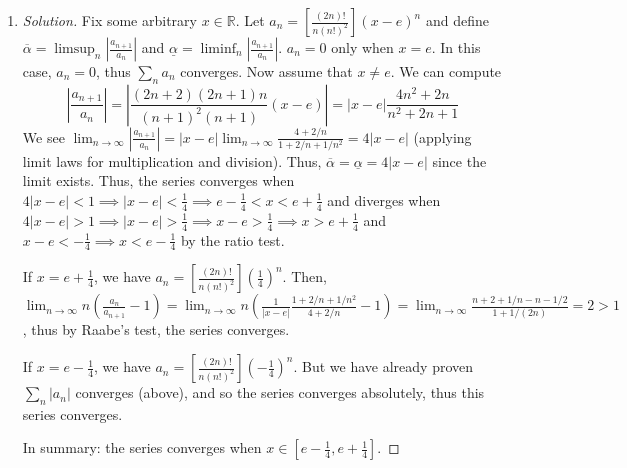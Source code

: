 \documentclass{article}
\newcommand{\R}{{\mathbb R}}
\begin{document}
\begin{enumerate}
\begin{proof}[Solution]
		Finally, if $x = 0$, $a_n = \frac{1}{\sqrt{n}}$,
		thus $\sum_n a_n$ diverges since this is a $p$-series
		where $p = \frac12 < 1$.
		
		In summary: the series converges when $x \in (-\infty,-\frac23] \cup (0,\infty)$.
	\end{proof}
	\item \begin{proof}[Solution]\let\qed\relax
		Fix some arbitrary $x \in \R$.
		Let $a_n = \left[\frac{(2n)!}{n(n!)^2}\right](x-e)^n$
		and define $\overline\alpha = \limsup_n \left|\frac{a_{n+1}}{a_n}\right|$
		and $\underline\alpha = \liminf_n \left|\frac{a_{n+1}}{a_n}\right|$.
		$a_n = 0$ only when $x = e$.
		In this case, $a_n = 0$, thus $\sum_n a_n$ converges.
		Now assume that $x \neq e$.
		We can compute
		\[
			\left\lvert \frac{a_{n+1}}{a_n}\right\rvert
			= \left\lvert \frac{(2n+2)(2n+1)n}{(n+1)^2(n+1)}(x-e)\right\rvert
			= |x-e| \frac{4n^2+2n}{n^2+2n+1}
		\]
		We see $\lim_{n\to\infty}\left\lvert \frac{a_{n+1}}{a_n}\right\rvert
		= |x-e|\lim_{n\to\infty}\frac{4+2/n}{1+2/n + 1/n^2} = 4|x-e|$
		(applying limit laws for multiplication and division).
		Thus, $\overline\alpha = \underline\alpha = 4|x-e|$
		since the limit exists.
		Thus, the series converges when $4|x-e| < 1 \implies |x-e| < \frac14
		\implies e-\frac14 < x < e + \frac14$ and diverges when $4|x-e| > 1 \implies |x-e| > \frac14 \implies
		x-e > \frac14 \implies x > e + \frac14$ and $x-e < -\frac14
		\implies x < e - \frac14$ by the ratio test.

		If $x = e + \frac14$, we have
		$a_n = \left[\frac{(2n)!}{n(n!)^2}\right]\left(\frac{1}{4}\right)^n$.
		Then, $\lim_{n\to\infty} n\left(\frac{a_n}{a_{n+1}} - 1\right)
		= \lim_{n\to\infty} n\left(\frac{1}{|x-e|}\frac{1+2/n+1/n^2}{4+2/n} - 1\right)
		= \lim_{n\to\infty} \frac{n+2+1/n - n-1/2}{1+1/(2n)} = 2 > 1$,
		thus by Raabe's test,
		the series converges.

		If $x = e-\frac14$,
		we have $a_n = \left[\frac{(2n)!}{n(n!)^2}\right]\left(-\frac{1}{4}\right)^n$.
		But we have already proven $\sum_n |a_n|$ converges (above),
		and so the series converges absolutely,
		thus this series converges.

		In summary: the series converges when $x\in [e-\frac14, e+\frac14]$.
	\end{proof}
\end{enumerate}
\clearpage
\end{document}
